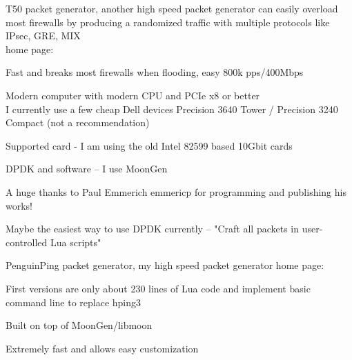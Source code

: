 \documentclass[Screen16to9,17pt]{foils}
\begin{document}
\begin{list2}
\item T50 packet generator, another high speed packet generator
can easily overload most firewalls by producing a randomized traffic with multiple protocols like IPsec, GRE, MIX \\
home page: 
\end{list2}

\centerline{Fast and breaks most firewalls when flooding, easy 800k pps/400Mbps}




\begin{list2}
\item Modern computer with modern CPU and PCIe x8 or better\\
I currently use a few cheap Dell devices Precision 3640 Tower / Precision 3240 Compact (not a recommendation)
\item Supported card - I am using the old Intel 82599 based 10Gbit cards
\item DPDK and software -- I use MoonGen 
\item A huge thanks to Paul Emmerich emmericp for programming and publishing his works!
\item Maybe the easiest way to use DPDK currently -- "Craft all packets in user-controlled Lua scripts"
\end{list2}




\begin{list2}
\item PenguinPing packet generator, my high speed packet generator
home page: 
\item First versions are only about 230 lines of Lua code and implement basic command line to replace hping3
\item Built on top of MoonGen/libmoon 
\end{list2}

\centerline{Extremely fast and allows easy customization}


\end{document}
